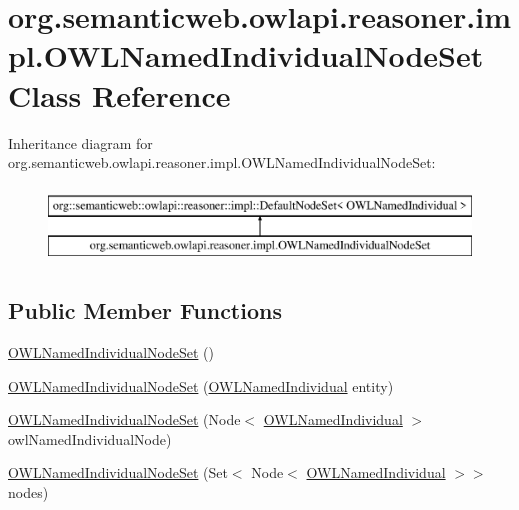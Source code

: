 \hypertarget{classorg_1_1semanticweb_1_1owlapi_1_1reasoner_1_1impl_1_1_o_w_l_named_individual_node_set}{\section{org.\-semanticweb.\-owlapi.\-reasoner.\-impl.\-O\-W\-L\-Named\-Individual\-Node\-Set Class Reference}
\label{classorg_1_1semanticweb_1_1owlapi_1_1reasoner_1_1impl_1_1_o_w_l_named_individual_node_set}
}
Inheritance diagram for org.\-semanticweb.\-owlapi.\-reasoner.\-impl.\-O\-W\-L\-Named\-Individual\-Node\-Set\-:\begin{figure}[H]
\begin{center}
\leavevmode
\includegraphics[height=2.000000cm]{classorg_1_1semanticweb_1_1owlapi_1_1reasoner_1_1impl_1_1_o_w_l_named_individual_node_set}
\end{center}
\end{figure}
\subsection*{Public Member Functions}
\begin{DoxyCompactItemize}
\item 
\hyperlink{classorg_1_1semanticweb_1_1owlapi_1_1reasoner_1_1impl_1_1_o_w_l_named_individual_node_set_a5156c5e4ac28c30bf21c72ebbcc3b242}{O\-W\-L\-Named\-Individual\-Node\-Set} ()
\item 
\hyperlink{classorg_1_1semanticweb_1_1owlapi_1_1reasoner_1_1impl_1_1_o_w_l_named_individual_node_set_af7d59d5737baeee75741af9d8abb4d8d}{O\-W\-L\-Named\-Individual\-Node\-Set} (\hyperlink{interfaceorg_1_1semanticweb_1_1owlapi_1_1model_1_1_o_w_l_named_individual}{O\-W\-L\-Named\-Individual} entity)
\item 
\hyperlink{classorg_1_1semanticweb_1_1owlapi_1_1reasoner_1_1impl_1_1_o_w_l_named_individual_node_set_a8195de4b4ffa8f6c76fd667d869b590f}{O\-W\-L\-Named\-Individual\-Node\-Set} (Node$<$ \hyperlink{interfaceorg_1_1semanticweb_1_1owlapi_1_1model_1_1_o_w_l_named_individual}{O\-W\-L\-Named\-Individual} $>$ owl\-Named\-Individual\-Node)
\item 
\hyperlink{classorg_1_1semanticweb_1_1owlapi_1_1reasoner_1_1impl_1_1_o_w_l_named_individual_node_set_afc4bd5e2f3001e068dceb3efdc5a2b96}{O\-W\-L\-Named\-Individual\-Node\-Set} (Set$<$ Node$<$ \hyperlink{interfaceorg_1_1semanticweb_1_1owlapi_1_1model_1_1_o_w_l_named_individual}{O\-W\-L\-Named\-Individual} $>$$>$ nodes)
\end{DoxyCompactItemize}
